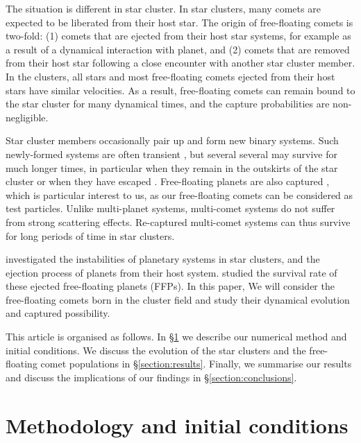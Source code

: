 \documentclass[usenatbib]{mnras}
\begin{document}

The situation is different in star cluster. In star clusters, many comets are expected to be liberated from their host star. The origin of free-floating comets is two-fold: (1) comets that are ejected from their host star systems, for example as a result of a dynamical interaction with planet, and (2) comets that are removed from their host star following a close encounter with another star cluster member. In the clusters, all stars and most free-floating comets ejected from their host stars have similar velocities. As a result, free-floating comets can remain bound to the star cluster for many dynamical times, and the capture probabilities are non-negligible.

Star cluster members occasionally pair up and form new binary systems. Such newly-formed systems are often transient \citep[e.g.,][]{Moeckel:2011aa}, but several several may survive for much longer times, in particular when they remain in the outskirts of the star cluster or when they have escaped \citep{Kouwenhoven:2010aa}. Free-floating planets are also captured \citep{Perets:2012aa}, which is particular interest to us, as our free-floating comets can be considered as test particles. Unlike multi-planet systems, multi-comet systems do not suffer from strong scattering effects. Re-captured multi-comet systems can thus survive for long periods of time in star clusters.


\cite{Spurzem:2009aa} investigated the instabilities of planetary systems in star clusters, and the ejection process of planets from their host system.  \cite{Wang:2015ab}  studied the survival rate of these ejected free-floating planets (FFPs). In this paper, We will consider the free-floating comets born in the cluster field and study their dynamical evolution and captured possibility.

This article is organised as follows. In \S\ref{section:method} we describe our numerical method and initial conditions. We discuss the evolution of the star clusters and the free-floating comet populations in \S\ref{section:results}. Finally, we summarise our results and discuss the implications of our findings in \S\ref{section:conclusions}.

\section{Methodology and initial conditions} \label{section:method}
\end{document}
